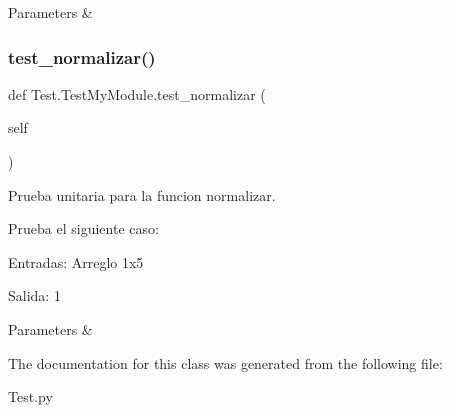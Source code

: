\begin{DoxyParams}{Parameters}
{\em } & \\
\hline
\end{DoxyParams}
\mbox{\label{class_test_1_1_test_my_module_a7596dd0f3e897a276e057cfa6557ef1b}} 
\subsubsection{\texorpdfstring{test\+\_\+normalizar()}{test\_normalizar()}}
{\footnotesize\ttfamily def Test.\+Test\+My\+Module.\+test\+\_\+normalizar (\begin{DoxyParamCaption}\item[{}]{self }\end{DoxyParamCaption})}



Prueba unitaria para la funcion normalizar. 

Prueba el siguiente caso\+:
\begin{DoxyEnumerate}
\item Entradas\+: Arreglo 1x5
\item Salida\+: 1
\end{DoxyEnumerate}


\begin{DoxyParams}{Parameters}
{\em } & \\
\hline
\end{DoxyParams}


The documentation for this class was generated from the following file\+:\begin{DoxyCompactItemize}
\item 
Test.\+py\end{DoxyCompactItemize}
